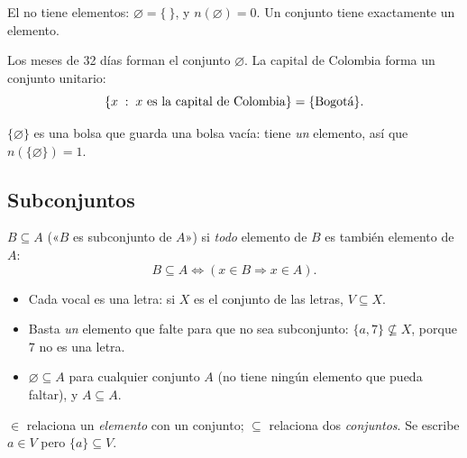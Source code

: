 \documentclass[11pt,a4paper]{article}
\begin{document}
\begin{definicion}
El  no tiene elementos: $\varnothing=\{\ \}$, y $n(\varnothing)=0$.
Un conjunto  tiene exactamente un elemento.
\end{definicion}
\begin{ejemplo}
Los meses de 32 días forman el conjunto $\varnothing$. La capital de Colombia forma un conjunto unitario:
\[ \{x\;:\; x\text{ es la capital de Colombia}\}=\{\text{Bogotá}\}. \]
\end{ejemplo}
\begin{ojo}
$\{\varnothing\}$ es una bolsa que guarda una bolsa vacía: tiene \emph{un} elemento, así que $n(\{\varnothing\})=1$.
\end{ojo}

\subsection{Subconjuntos}
\begin{minipage}[c]{0.56\linewidth}
\begin{definicion}[Subconjunto]
$B\subseteq A$ («$B$ es subconjunto de $A$») si \emph{todo} elemento de $B$ es también elemento de $A$:
\[ B\subseteq A \iff (x\in B \Rightarrow x\in A). \]
\end{definicion}
\end{minipage}\hfill
\begin{minipage}[c]{0.4\linewidth}
\centering
{}
\end{minipage}

\begin{itemize}
\item Cada vocal es una letra: si $X$ es el conjunto de las letras, $V\subseteq X$.
\item Basta \emph{un} elemento que falte para que no sea subconjunto: $\{a,7\}\not\subseteq X$, porque $7$ no es una letra.
\item $\varnothing\subseteq A$ para cualquier conjunto $A$ (no tiene ningún elemento que pueda faltar), y $A\subseteq A$.
\end{itemize}
\begin{ojo}
$\in$ relaciona un \emph{elemento} con un conjunto; $\subseteq$ relaciona dos \emph{conjuntos}.
Se escribe $a\in V$ pero $\{a\}\subseteq V$.
\end{ojo}
\end{document}
